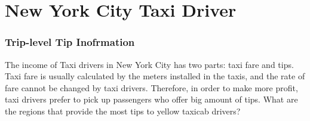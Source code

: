 \documentclass[12pt,twoside]{reedthesis}
\theoremstyle{definition}
\theoremstyle{definition}
\theoremstyle{definition}
\theoremstyle{remark}
\begin{document}
\chapter{New York City Taxi Driver}\label{chapter2}

\subsection{Trip-level Tip
Inofrmation}\label{trip-level-tip-inofrmation}

The income of Taxi drivers in New York City has two parts: taxi fare and
tips. Taxi fare is usually calculated by the meters installed in the
taxis, and the rate of fare cannot be changed by taxi drivers.
Therefore, in order to make more profit, taxi drivers prefer to pick up
passengers who offer big amount of tips. What are the regions that
provide the most tips to yellow taxicab drivers?
\end{document}
